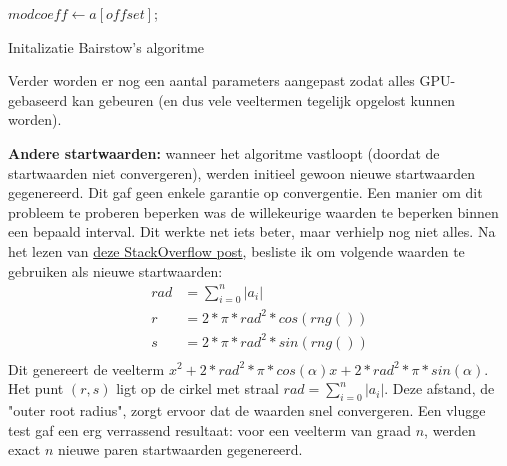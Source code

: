 \documentclass{article}
\begin{document}
\begin{algorithm}[H]
 $modcoeff \gets a[offset]$; 
 \caption{Initalizatie Bairstow's algoritme}
\end{algorithm}
Verder worden er nog een aantal parameters aangepast zodat alles GPU-gebaseerd kan gebeuren (en dus vele veeltermen tegelijk opgelost kunnen worden).

\textbf{Andere startwaarden:} wanneer het algoritme vastloopt (doordat de startwaarden niet convergeren), werden initieel gewoon nieuwe startwaarden gegenereerd. Dit gaf geen enkele garantie op convergentie. Een manier om dit probleem te proberen beperken was de willekeurige waarden te beperken binnen een bepaald interval. Dit werkte net iets beter, maar verhielp nog niet alles. Na het lezen van \href{https://stackoverflow.com/questions/32201058/bairstows-method-initial-quadratic-approximations}{deze StackOverflow post}, besliste ik om volgende waarden te gebruiken als nieuwe startwaarden:
\begin{align*}
rad &= \sum_{i=0}^{n}{|a_i|} \\
r &= 2 * \pi * rad^2 * cos(rng()) \\
s &= 2 * \pi * rad^2 * sin(rng()) \\
\end{align*}
Dit genereert de veelterm $x^2 + 2*rad^2*\pi*cos(\alpha)x + 2*rad^2*\pi*sin(\alpha)$. Het punt $(r, s)$ ligt op de cirkel met straal $rad = \sum_{i=0}^{n}{|a_i|}$. Deze afstand, de "outer root radius", zorgt ervoor dat de waarden snel convergeren. Een vlugge test gaf een erg verrassend resultaat: voor een veelterm van graad $n$, werden exact $n$ nieuwe paren startwaarden gegenereerd.
\end{document}
